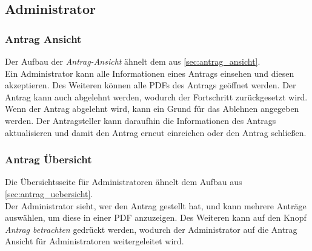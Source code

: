 \subsection{Administrator}
\subsubsection{Antrag Ansicht}
Der Aufbau der \textit{Antrag-Ansicht} ähnelt dem aus \autoref{sec:antrag_ansicht}.\\
Ein Administrator kann alle Informationen eines Antrags einsehen und diesen akzeptieren. Des Weiteren können alle PDFs des Antrags geöffnet werden. Der Antrag kann auch abgelehnt werden, wodurch der Fortschritt zurückgesetzt wird. Wenn der Antrag abgelehnt wird, kann ein Grund für das Ablehnen angegeben werden. Der Antragsteller kann daraufhin die Informationen des Antrags aktualisieren und damit den Antrag erneut einreichen oder den Antrag schließen.
\subsubsection{Antrag Übersicht}
Die Übersichtsseite für Administratoren ähnelt dem Aufbau aus \autoref{sec:antrag_uebersicht}.\\
Der Administrator sieht, wer den Antrag gestellt hat, und kann mehrere Anträge auswählen, um diese in einer PDF anzuzeigen.
Des Weiteren kann auf den Knopf \textit{Antrag betrachten} gedrückt werden, wodurch der Administrator auf die Antrag Ansicht für Administratoren weitergeleitet wird.
\newpage
